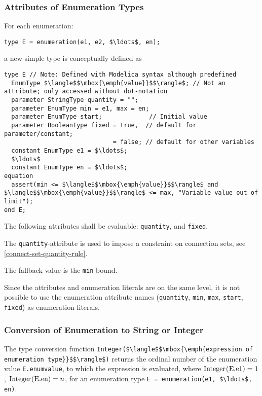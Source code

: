\subsubsection{Attributes of Enumeration Types}\label{attributes-of-enumeration-types}

For each enumeration:
\begin{lstlisting}[language=modelica]
type E = enumeration(e1, e2, $\ldots$, en);
\end{lstlisting}
a new simple type is conceptually defined as
\begin{lstlisting}[language=modelica]
type E // Note: Defined with Modelica syntax although predefined
  EnumType $\langle$$\mbox{\emph{value}}$$\rangle$; // Not an attribute; only accessed without dot-notation
  parameter StringType quantity = "";
  parameter EnumType min = e1, max = en;
  parameter EnumType start;             // Initial value
  parameter BooleanType fixed = true,  // default for parameter/constant;
                              = false; // default for other variables
  constant EnumType e1 = $\ldots$;
  $\ldots$
  constant EnumType en = $\ldots$;
equation
  assert(min <= $\langle$$\mbox{\emph{value}}$$\rangle$ and $\langle$$\mbox{\emph{value}}$$\rangle$ <= max, "Variable value out of limit");
end E;
\end{lstlisting}

The following attributes shall be evaluable: \lstinline!quantity!, and \lstinline!fixed!.

The \lstinline!quantity!-attribute is used to impose a constraint on connection sets, see \cref{connect-set-quantity-rule}.

The fallback value is the \lstinline!min! bound.

\begin{nonnormative}
Since the attributes and enumeration literals are on the same level, it is not possible to use the enumeration attribute names (\lstinline!quantity!, \lstinline!min!, \lstinline!max!, \lstinline!start!, \lstinline!fixed!) as enumeration literals.
\end{nonnormative}

\subsubsection{Conversion of Enumeration to String or Integer}\label{conversion-of-enumeration-to-string-or-integer}\label{type-conversion-of-enumeration-values-to-string-or-integer}

The type conversion function \lstinline!Integer($\langle$$\mbox{\emph{expression of enumeration type}}$$\rangle$)! returns the ordinal number of the enumeration value \lstinline!E.enumvalue!, to which the expression is evaluated, where $\text{\lstinline!Integer(E.e1)!} = 1$, $\text{\lstinline!Integer(E.en)!} = n$, for an enumeration type \lstinline!E = enumeration(e1, $\ldots$, en)!.

